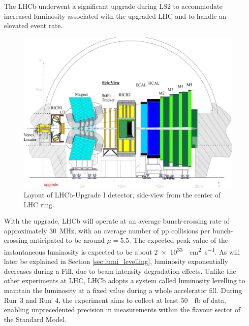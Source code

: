 The LHCb underwent a significant upgrade during LS$2$ to accommodate increased luminosity associated with the upgraded LHC and to handle an elevated event rate.
\begin{figure}[h]
    \centering
    \includegraphics[width=\textwidth]{figures/UT-upgrade-detector-scaled.jpeg}
    \caption{Layout of LHCb-Upgrade I detector, side-view from the center of LHC ring.}
    \label{fig:lhcb-detector}
\end{figure}
With the upgrade, LHCb will operate at an average bunch-crossing rate of approximately \SI{30}{\mega\hertz}, with an average number of pp collisions per bunch-crossing anticipated to be around $\mu=5.5$. The expected peak value of the instantaneous luminosity is expected to be about \SI{2e33}{\per\centi\meter\squared\per\second}. As will later be explained in Section \ref{sec:lumi_levelling}, luminosity exponentially decreases during a Fill, due to beam intensity degradation effects. Unlike the other experiments at LHC, LHCb adopts a system called luminosity levelling to maintain the luminosity at a fixed value during a whole accelerator fill.  During Run~3 and Run~4, the experiment aims to collect at least \SI{50}{\per\femto\barn} of data, enabling unprecedented precision in measurements within the flavour sector of the Standard Model.

